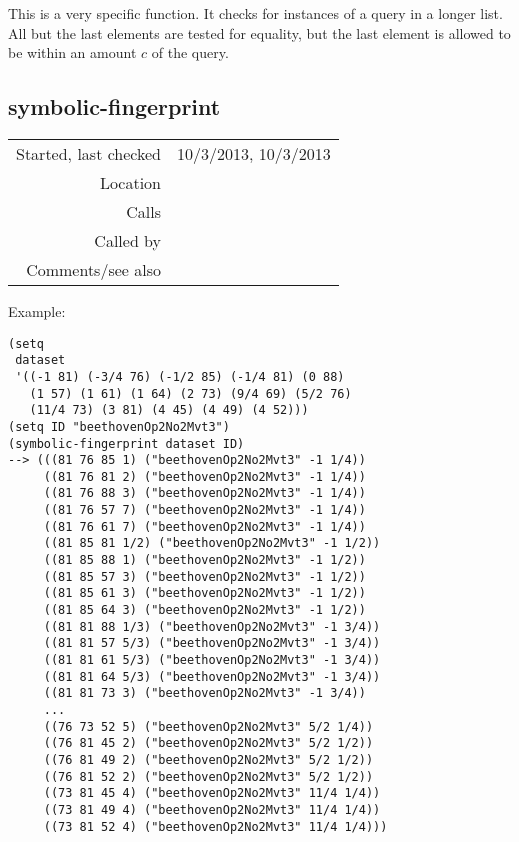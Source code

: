 \noindent This is a very specific function. It checks
for instances of a query in a longer list. All but the
last elements are tested for equality, but the last
element is allowed to be within an amount $c$ of the
query.


\subsection*{symbolic-fingerprint}\label{fun:symbolic-fingerprint}

\vspace{0.3cm}
\begin{tabular}{r|p{8cm}}
Started, last checked & 10/3/2013, 10/3/2013 \\
Location & \nameref{sec:matching-score} \\
Calls & \nameref{fun:nth-list-of-lists} \\
Called by & \nameref{fun:matching-score} \\
Comments/see also &
\end{tabular}

\vspace{0.5cm}
\noindent Example:
\begin{verbatim}
(setq
 dataset
 '((-1 81) (-3/4 76) (-1/2 85) (-1/4 81) (0 88)
   (1 57) (1 61) (1 64) (2 73) (9/4 69) (5/2 76)
   (11/4 73) (3 81) (4 45) (4 49) (4 52)))
(setq ID "beethovenOp2No2Mvt3")
(symbolic-fingerprint dataset ID)
--> (((81 76 85 1) ("beethovenOp2No2Mvt3" -1 1/4))
     ((81 76 81 2) ("beethovenOp2No2Mvt3" -1 1/4))
     ((81 76 88 3) ("beethovenOp2No2Mvt3" -1 1/4))
     ((81 76 57 7) ("beethovenOp2No2Mvt3" -1 1/4))
     ((81 76 61 7) ("beethovenOp2No2Mvt3" -1 1/4))
     ((81 85 81 1/2) ("beethovenOp2No2Mvt3" -1 1/2))
     ((81 85 88 1) ("beethovenOp2No2Mvt3" -1 1/2))
     ((81 85 57 3) ("beethovenOp2No2Mvt3" -1 1/2))
     ((81 85 61 3) ("beethovenOp2No2Mvt3" -1 1/2))
     ((81 85 64 3) ("beethovenOp2No2Mvt3" -1 1/2))
     ((81 81 88 1/3) ("beethovenOp2No2Mvt3" -1 3/4))
     ((81 81 57 5/3) ("beethovenOp2No2Mvt3" -1 3/4))
     ((81 81 61 5/3) ("beethovenOp2No2Mvt3" -1 3/4))
     ((81 81 64 5/3) ("beethovenOp2No2Mvt3" -1 3/4))
     ((81 81 73 3) ("beethovenOp2No2Mvt3" -1 3/4))
     ...
     ((76 73 52 5) ("beethovenOp2No2Mvt3" 5/2 1/4))
     ((76 81 45 2) ("beethovenOp2No2Mvt3" 5/2 1/2))
     ((76 81 49 2) ("beethovenOp2No2Mvt3" 5/2 1/2))
     ((76 81 52 2) ("beethovenOp2No2Mvt3" 5/2 1/2))
     ((73 81 45 4) ("beethovenOp2No2Mvt3" 11/4 1/4))
     ((73 81 49 4) ("beethovenOp2No2Mvt3" 11/4 1/4))
     ((73 81 52 4) ("beethovenOp2No2Mvt3" 11/4 1/4)))
\end{verbatim}

